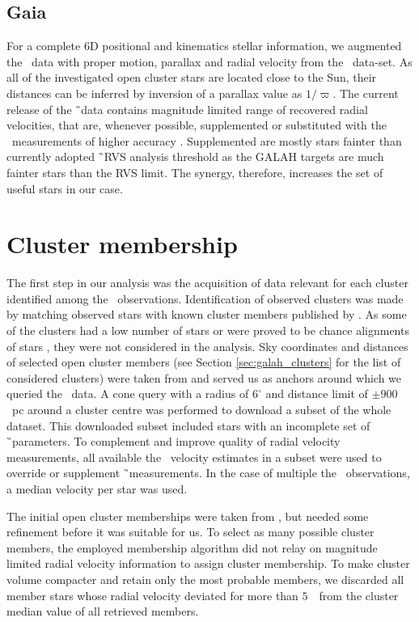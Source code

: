 \subsection{Gaia}
\label{sec:gaia_clusters}
For a complete 6D positional and kinematics stellar information, we augmented the \Gh\ data with proper motion, parallax and radial velocity from the \Gs\ data-set. As all of the investigated open cluster stars are located close to the Sun, their distances can be inferred by inversion of a parallax value as $1 / \varpi$. The current release of the \G\ data contains magnitude limited range of recovered radial velocities, that are, whenever possible, supplemented or substituted with the \Gh\ measurements of higher accuracy \cite{2018arXiv180406344Z}. Supplemented are mostly stars fainter than currently adopted \G\ RVS \cite{2018A&A...616A...5C} analysis threshold as the GALAH targets are much fainter stars than the RVS limit. The synergy, therefore, increases the set of useful stars in our case.

\section{Cluster membership}
\label{sec:membership_v2}
The first step in our analysis was the acquisition of data relevant for each cluster identified among the \Gh\ observations. Identification of observed clusters was made by matching observed stars with known cluster members published by \citet{2018A&A...618A..93C}. As some of the clusters had a low number of stars or were proved to be chance alignments of stars \citep{2018MNRAS.480.5242K}, they were not considered in the analysis. Sky coordinates and distances of selected open cluster members (see Section \ref{sec:galah_clusters} for the list of considered clusters) were taken from \citet{2018A&A...618A..93C} and served us as anchors around which we queried the \Gs\ data. A cone query with a radius of $6^\circ$ and distance limit of $\pm900$~pc around a cluster centre was performed to download a subset of the whole dataset. This downloaded subset included stars with an incomplete set of \G\ parameters. To complement and improve quality of radial velocity measurements, all available the \Gh\ velocity estimates in a subset were used to override or supplement \G\ measurements. In the case of multiple the \Gh\ observations, a median velocity per star was used.

The initial open cluster memberships were taken from \citet{2018A&A...618A..93C}, but needed some refinement before it was suitable for us. To select as many possible cluster members, the employed membership algorithm did not relay on magnitude limited radial velocity information to assign cluster membership. To make cluster volume compacter and retain only the most probable members, we discarded all member stars whose radial velocity deviated for more than $5$~\kms\ from the cluster median value of all retrieved members.

